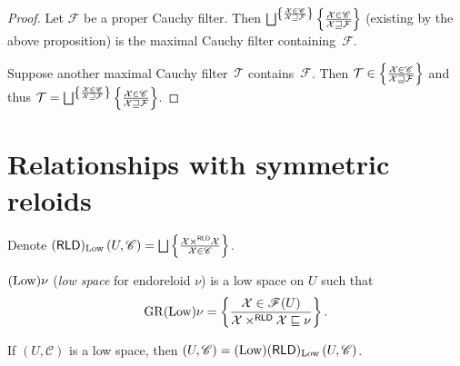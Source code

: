 \begin{proof}
Let $\mathcal{F}$ be a proper Cauchy filter. Then
$\bigsqcup^{ \setcond{\mathcal{X} \in \mathscr{C} }{\mathcal{X} \sqsupseteq \mathcal{F}} }\setcond{\mathcal{X} \in \mathscr{C} }{\mathcal{X} \sqsupseteq \mathcal{F}}$
(existing by the above proposition) is the maximal Cauchy filter containing~$\mathcal{F}$.

Suppose another maximal Cauchy filter~$\mathcal{T}$ contains~$\mathcal{F}$. Then $\mathcal{T}\in\left\{ \frac{\mathcal{X} \in \mathscr{C} }{\mathcal{X} \sqsupseteq \mathcal{F}}\right\}$
and thus $\mathcal{T} = \bigsqcup^{ \setcond{\mathcal{X} \in \mathscr{C} }{\mathcal{X} \sqsupseteq \mathcal{F}} }\setcond{\mathcal{X} \in \mathscr{C} }{\mathcal{X} \sqsupseteq \mathcal{F}}$.
\end{proof}

\section{Relationships with symmetric reloids}


\begin{defn}
  Denote $(\mathsf{RLD})_{\Low} \left( U , \mathscr{C} \right) =
  \bigsqcup \setcond{ \mathcal{X} \times^{\mathsf{RLD}} \mathcal{X}}
  {\mathcal{X} \in \mathscr{C} }$.
\end{defn}

\begin{defn}
  $(\operatorname{Low}) \nu$ (\emph{low space} for endoreloid $\nu$) is a low
  space on $U$ such that
  \[ \operatorname{GR} (\operatorname{Low}) \nu = \left\{ \frac{\mathcal{X} \in \mathscr{F}(U)}{\mathcal{X} \times^{\mathsf{RLD}} \mathcal{X} \sqsubseteq \nu }\right\} . \]
\end{defn}

\begin{thm}
  If $\left( U , \mathscr{C} \right)$ is a low space, then $\left( U ,
  \mathscr{C} \right) = (\operatorname{Low}) (\mathsf{RLD})_{\operatorname{Low}} \left(
  U , \mathscr{C} \right)$.
\end{thm}

